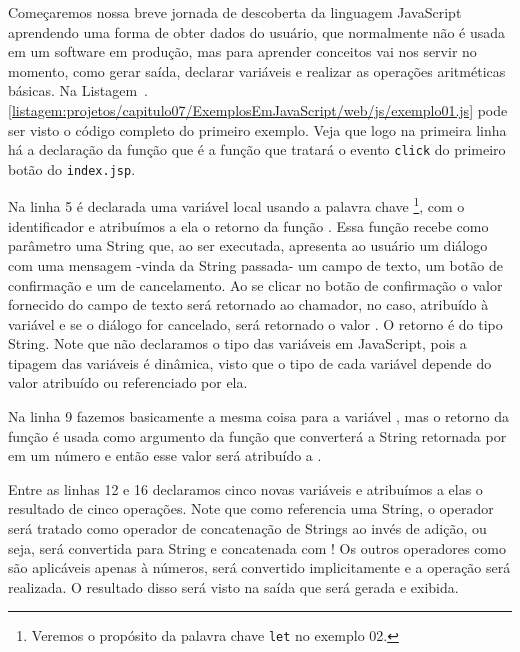 Começaremos nossa breve jornada de descoberta da linguagem JavaScript aprendendo uma forma de obter dados do usuário, que normalmente não é usada em um software em produção, mas para aprender conceitos vai nos servir no momento, como gerar saída, declarar variáveis e realizar as operações aritméticas básicas. Na Listagem~\thechapter.\ref{listagem:projetos/capitulo07/ExemplosEmJavaScript/web/js/exemplo01.js} pode ser visto o código completo do primeiro exemplo. Veja que logo na primeira linha há a declaração da função  que é a função que tratará o evento \texttt{click} do primeiro botão do \texttt{index.jsp}.


Na linha 5 é declarada uma variável local usando a palavra chave \footnote{Veremos o propósito da palavra chave \texttt{let} no exemplo 02.}, com o identificador  e atribuímos a ela o retorno da função . Essa função recebe como parâmetro uma String que, ao ser executada, apresenta ao usuário um diálogo com uma mensagem -vinda da String passada- um campo de texto, um botão de confirmação e um de cancelamento. Ao se clicar no botão de confirmação o valor fornecido do campo de texto será retornado ao chamador, no caso, atribuído à variável  e se o diálogo for cancelado, será retornado o valor . O retorno é do tipo String. Note que não declaramos o tipo das variáveis em JavaScript, pois a tipagem das variáveis é dinâmica, visto que o tipo de cada variável depende do valor atribuído ou referenciado por ela.

Na linha 9 fazemos basicamente a mesma coisa para a variável , mas o retorno da função  é usada como argumento da função  que converterá a String retornada por  em um número e então esse valor será atribuído a .

Entre as linhas 12 e 16 declaramos cinco novas variáveis e atribuímos a elas o resultado de cinco operações. Note que como  referencia uma String, o operador \inlineJavaScriptCode{+} será tratado como operador de concatenação de Strings ao invés de adição, ou seja,  será convertida para String e concatenada com ! Os outros operadores como são aplicáveis apenas à números,  será convertido implicitamente e a operação será realizada. O resultado disso será visto na saída que será gerada e exibida.

